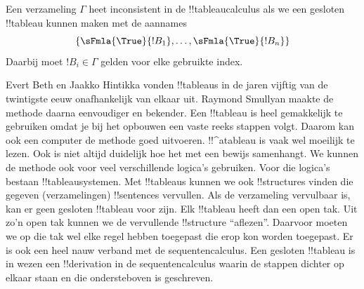 \documentclass[../../../include/open-logic-section]{subfiles}
\begin{document}
Een verzameling $\Gamma$ heet inconsistent in de !!{tableau}calculus als
we een gesloten !!{tableau} kunnen maken met de aannames
\[
\{\sFmla{\True}{!B_1}, \dots, \sFmla{\True}{!B_n}\} 
\]
Daarbij moet $!B_i \in \Gamma$ gelden voor elke gebruikte index.

Evert Beth en Jaakko Hintikka vonden !!{tableau}s in de jaren vijftig
van de twintigste eeuw onafhankelijk van elkaar uit. Raymond Smullyan
maakte de methode daarna eenvoudiger en bekender. Een !!{tableau} is
heel gemakkelijk te gebruiken omdat je bij het opbouwen een vaste reeks
stappen volgt. Daarom kan ook een computer de methode goed uitvoeren.
!!^a{tableau} is vaak wel moeilijk te lezen. Ook is
niet altijd duidelijk hoe het met een bewijs samenhangt. We kunnen de
methode ook voor veel verschillende logica's gebruiken. Voor die
logica's bestaan !!{tableau}systemen. Met !!{tableau}s kunnen we ook
!!{structure}s
vinden die gegeven (verzamelingen) !!{sentence}s vervullen. Als de
verzameling vervulbaar is, kan er geen gesloten !!{tableau} voor zijn.
Elk !!{tableau} heeft dan een open tak. Uit zo'n open tak kunnen we de
vervullende !!{structure} ``aflezen''. Daarvoor moeten we op die tak
wel elke regel hebben toegepast die erop kon worden toegepast. Er is
ook een heel nauw verband met de sequentencalculus. Een gesloten
!!{tableau} is in wezen een !!{derivation} in de sequentencalculus
waarin de stappen dichter op elkaar staan en die ondersteboven is
geschreven.
\end{document}
